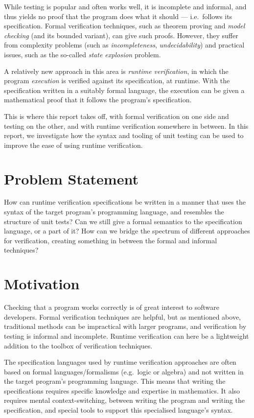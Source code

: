 \documentclass[a4paper,11pt]{kth-mag}
\theoremstyle{definition}
\begin{document}
While testing is popular and often works well, it is incomplete and informal,
and thus yields no proof that the program does what it should --- i.e.\ follows
its specification. Formal verification techniques, such as theorem proving and
\textit{model checking} (and its bounded variant), can give such proofs.
However, they suffer from complexity problems (such as \textit{incompleteness},
\textit{undecidability}) and practical issues, such as the so-called
\textit{state explosion} problem.

A relatively new approach in this area is \textit{runtime verification}, in
which the program \textit{execution} is verified against its specification, at
runtime. With the specification written in a suitably formal language, the
execution can be given a mathematical proof that it follows the program's
specification.

This is where this report takes off, with formal verification on one side and
testing on the other, and with runtime verification somewhere in between. In
this report, we investigate how the syntax and tooling of unit testing can be
used to improve the ease of using runtime verification.


\section{Problem Statement} \label{section-problem-statement}

How can runtime verification specifications be written in a manner that uses
the syntax of the target program's programming language, and resembles the
structure of unit tests? Can we still give a formal semantics to the
specification language, or a part of it? How can we bridge the spectrum of
different approaches for verification, creating something in between the formal
and informal techniques?


\section{Motivation}

Checking that a program works correctly is of great interest to software
developers. Formal verification techniques are helpful, but as mentioned above,
traditional methods can be impractical with larger programs, and verification
by testing is informal and incomplete. Runtime verification can here be a
lightweight addition to the toolbox of verification techniques.

The specification languages used by runtime verification approaches are often
based on formal languages/formalisms (e.g.\ logic or algebra) and not written
in the target program's programming language. This means that writing the
specifications requires specific knowledge and expertise in mathematics. It
also requires mental context-switching, between writing the program and writing
the specification, and special tools to support this specialised language's
syntax.
\end{document}
